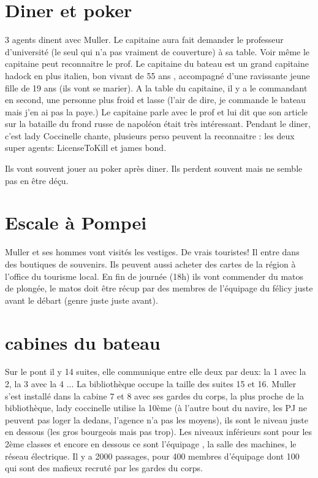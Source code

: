 \documentclass[oneside,12pt]{book}
\begin{document}
\begin{flushleft}
\section{Diner et poker}
3 agents dinent avec Muller. 
Le capitaine aura fait demander le professeur d'université (le seul qui n'a pas vraiment de couverture) à sa table. Voir même le capitaine peut reconnaitre le prof. 
Le capitaine du bateau est un grand capitaine hadock en plus italien, bon vivant de 55 ans , accompagné d'une ravissante jeune fille de 19 ans (ils vont se marier).
A la table du capitaine, il y a le commandant en second, une personne plus froid et lasse (l'air de dire, je commande le bateau mais j'en ai pas la paye.) 
Le capitaine parle avec le prof et lui dit que son article sur la bataille du frond russe de napoléon était très intéressant. 
Pendant le diner, c'est lady Coccinelle chante, plusieurs perso peuvent la reconnaitre : les deux super agents: LicenseToKill et james bond.

Ils vont souvent jouer au poker après diner. Ils perdent souvent mais ne semble pas en être déçu.

\section{Escale à Pompei}
Muller et ses hommes vont visités les vestiges. De vrais touristes! Il entre dans des boutiques de souvenirs. Ils peuvent aussi acheter des cartes de la région à l'office du tourisme local. En fin de journée (18h) ils vont commender du matos de plongée, le matos doit être récup par des membres de l'équipage du félicy juste avant le débart (genre juste juste avant). 

\section{cabines du bateau}
Sur le pont il y 14 suites, elle communique entre elle deux par deux: la 1 avec la 2, la 3 avec la 4 ... 
La bibliothèque occupe la taille des suites 15 et 16. Muller s'est installé dans la cabine 7 et 8 avec ses gardes du corps, la plus proche de la bibliothèque, lady coccinelle utilise la 10ème (à l'autre bout du navire, les PJ ne peuvent pas loger la dedans, l'agence n'a pas les moyens), ils sont le niveau juste en dessous (les gros bourgeois mais pas trop). Les niveaux inférieurs sont pour les 2ème classes et encore en dessous ce sont l'équipage , la salle des machines, le réseau électrique.
Il y a 2000 passages, pour 400 membres d'équipage dont 100 qui sont des mafieux recruté par les gardes du corps.



\end{flushleft}
\end{document}
